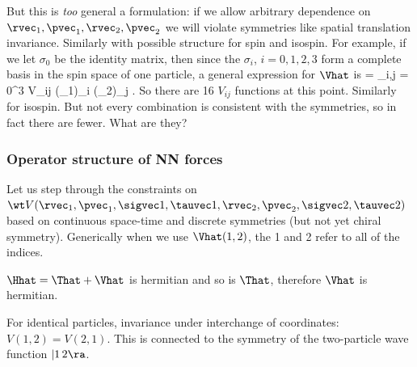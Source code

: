 But this is \emph{too} general a formulation: if we allow arbitrary dependence on
$\rvec_1,\pvec_1,\rvec_2,\pvec_2$ we will violate symmetries like spatial translation
invariance.  Similarly with possible structure for spin and isospin.  For example,
if we let $\sigma_0$ be the identity matrix, then since the $\sigma_i$, $i=0,1,2,3$ form
a complete basis in the spin space of one particle, a general expression for $\Vhat$
is 
\beq
   \Vhat = \sum_{i,j = 0}^{3} V_{ij} (\sigma_1)_i (\sigma_2)_j
    \;.
\eeq
So there are 16 $V_{ij}$ functions at this point.
Similarly for isospin.  But not every combination is consistent with the symmetries,
so in fact there are fewer.  What are they?







\subsubsection{Operator structure of NN forces}


Let us step through the constraints on 
$\wt V(\rvec_1,\pvec_1,\sigvec1,\tauvec1,\rvec_2,\pvec_2,\sigvec2,\tauvec2)$
based on continuous space-time and discrete symmetries (but not yet chiral symmetry).
Generically when we use $\Vhat(1,2)$, the 1 and 2 refer to all of the indices.

\be

  \I $\Hhat = \That + \Vhat$ is hermitian and so is $\That$, therefore $\Vhat$ is hermitian.

  \I For identical particles, invariance under interchange of coordinates: $V(1,2) = V(2,1)$.
  This is connected to the symmetry of the two-particle wave function $|1\, 2\ra$.

